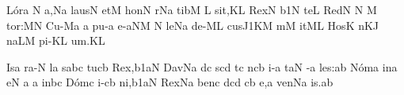 \Internote
\nosolesmescustos
\initiumgregorianum
%
\sgn L{\'o}r\punctum a\egn
{}\punctum N\egn
\sgn {}a{,}\pes Na\egn
\spatium
\sgn l{au}s\bivirga N\egn
\spatium
\sgn {}et\punctum M\egn
\spatium
\sgn h{o}n\punctum N\egn
{}r\pes Na\egn
\spatium
\sgn t{i}b\punctum M\egn
{}\punctum L\egn
\spatium
\sgn si{t,}\punctum K\augmentum L\egn
\spatium
\divisiominima
\spatium
\sgn Rex\punctum N\egn
\spatium
{}\episem b1\punctum N\egn
\sgn te{}\punctum L\egn
\spatium
\sgn Red\punctum N\egn
{}\bivirga N\egn
\custos M
\lineaproxima
\sgn to{r:}\engl{}\punctum M\augmentum N\egn
\spatium
\divisiomaior
\spatium
\sgn C{u}{-}\pes Ma\egn
{}\punctum a\egn
\spatium
\sgn pu{-}\punctum a\egn
\sgn {}e{-}\climacus aNM\egn
{}\punctum N\egn
\sgn le{}\pes Na\egn
\spatium
\sgn d{e}-\clivis ML\egn
\sgn cu{s}\episem J1\pes KM\egn
\spatium
\divisiominima
\spatium
m\punctum M\egn
{}it\clivis ML\egn
\spatium
\sgn Hos\punctum K\egn
{}n\cephalicus KJ\egn
\sgn na{}\pes LM\egn
\spatium
\sgn p{i}-\punctum K\augmentum L\egn
\sgn {}u{m.}\punctum K\augmentum L\egn
\spatium
\Finisgregoriana


\bigskip

\nosolesmescustos
\initiumgregorianum
%
\sgn {}Is\punctum a\egn
\sgn ra-\punctum N\egn
{}l\punctum a\egn
\spatium
{}s\punctum a\nonspatium\quilismapes bc\egn
\spatium
\sgn tu{}\clivis cb\egn
\spatium
\sgn Re{x,}\episem b1\clivis aN\egn
\spatium
\divisiominima
\spatium
\sgn Dav\pes Na\egn
\sgn {}{\'\i}d\punctum c\egn
{}s\pes cd\egn
\spatium
{}t\punctum c\egn
\spatium
\sgn {}{\'\i}n\cephalicus cb\egn
{}i-\punctum a\egn
\sgn ta{}\punctum N\egn
\spatium
{}-\punctum a\egn
\sgn le{s:}\punctum a\augmentum b\egn
\spatium
\divisiomaior
\spatium
\sgn N{\'o}m\punctum a\egn
\sgn {}in\punctum a\egn
\sgn {}e{}\punctum N\egn
\spatium
\custos a
\lineaproxima
{}\punctum a\egn
\spatium
\sgn {}in\quilismapes bc\egn
\spatium
\sgn D{\'o}m\punctum c\egn
\sgn {}i-\clivis cb\egn
\sgn ni,\episem b1\clivis aN\egn
\spatium
\divisiominima
\spatium
\sgn Rex\pes Na\egn
\spatium
\sgn ben\punctum c\egn
{}d\pes cd\egn
{}\clivis cb\egn
\sgn {}e,\punctum a\egn
\spatium
\sgn v{e}n\pes Na\egn
\sgn {}i{s.}\punctum a\augmentum b\egn
\spatium
\Finisgregoriana

